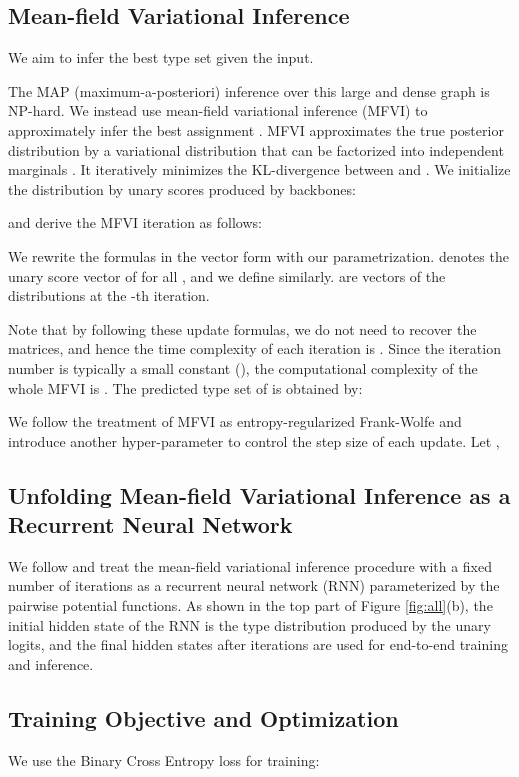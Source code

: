 \documentclass[11pt]{article}
\begin{document}
\subsection{Mean-field Variational Inference}
\label{sec:mfvi}
We aim to infer the best type set given the input.

The MAP (maximum-a-posteriori) inference over this large and dense graph is NP-hard. We instead use mean-field variational inference (MFVI) to approximately infer the best assignment . MFVI approximates the true posterior distribution  by a variational distribution  that can be factorized into independent marginals \cite{wainwright2008graphical}. It iteratively minimizes the KL-divergence between  and . We initialize the  distribution by unary scores produced by backbones:

 and derive the MFVI iteration as follows:

We rewrite the formulas in the vector form with our parametrization.  denotes the unary score vector of  for all , and we define  similarly.
 are vectors of the  distributions at the -th iteration.


Note that by following these update formulas, we do not need to recover the  matrices, and hence the time complexity of each iteration is . Since the iteration number  is typically a small constant (), the computational complexity of the whole MFVI is . The predicted type set of  is obtained by:

We follow the treatment of MFVI as entropy-regularized Frank-Wolfe \cite{le2021regularized} and introduce another hyper-parameter  to control the step size of each update. Let ,

\subsection{Unfolding Mean-field Variational Inference as a Recurrent Neural Network}
We follow \citet{crfrnn} and treat the mean-field variational inference procedure with a fixed number of iterations
 as a recurrent neural network (RNN) parameterized by the pairwise potential functions. As shown in the top part of Figure \ref{fig:all}(b), the initial hidden state of the RNN is the type distribution  produced by the unary logits, and the final hidden states  after  iterations are used for end-to-end training and inference.
 
 \subsection{Training Objective and Optimization} 
We use the Binary Cross Entropy loss for training:
\end{document}
